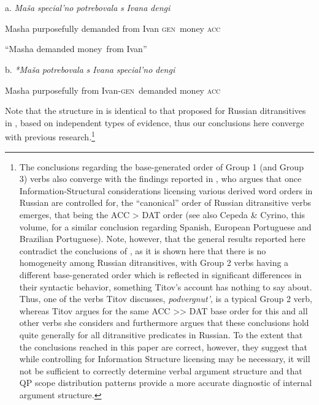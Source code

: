 \documentclass[output=paper,modfonts, nonflat]{langsci/langscibook}
\begin{document}
\begin{styleinnerExample}
\ea%
    \label{ex:key:48}
    \gll\\
        \\
    \glt
    \z

           a.  \textit{Maša}   \textit{special’no}    \textit{potrebovala} \textit{s}       \textit{Ivana}      \textit{dengi~}
\end{styleinnerExample}

\begin{styleinnerExample}
    Masha purposefully demanded     from Ivan \textsc{gen~}money \textsc{acc}
\end{styleinnerExample}

\begin{styleinnerExample}
    “Masha demanded money~from Ivan”\\\end{styleinnerExample}

\begin{styleinnerExample}
  b.  \textit{*Maša}   \textit{potrebovala}  \textit{s}       \textit{Ivana}       \textit{special’no} \textit{dengi}~
\end{styleinnerExample}

\begin{styleinnerExample}
      Masha purposefully from Ivan\textsc{{}-gen~}demanded  money \textsc{acc}
\end{styleinnerExample}

Note that the structure in  is identical to that proposed for Russian ditransitives in \citet{Bailyn1995},  based on independent types of evidence, thus our conclusions here converge with previous research.\footnote{The conclusions regarding the base-generated order of Group 1 (and Group 3) verbs also converge with the findings reported in \citet{Titov2017}, who argues that once Information-Structural considerations licensing various derived word orders in Russian are controlled for, the “canonical” order of Russian ditransitive verbs emerges, that being the ACC > DAT order (see also Cepeda \& Cyrino, this volume, for a similar conclusion regarding Spanish, European Portuguese and Brazilian Portuguese). Note, however, that the general results reported here contradict the conclusions of \citet{Titov2017}, as it is shown here that there is no homogeneity among Russian ditransitives, with Group 2 verbs having a different base-generated order which is reflected in significant differences in their syntactic behavior, something Titov’s account has nothing to say about. Thus, one of the verbs Titov discusses, \textit{podvergnut’}, is a typical Group 2 verb, whereas Titov argues for the same ACC >> DAT base order for this and all other verbs she considers and furthermore argues that these conclusions hold quite generally for all ditransitive predicates in Russian. To the extent that the conclusions reached in this paper are correct, however, they suggest that while controlling for Information Structure licensing may be necessary, it will not be sufficient to correctly determine verbal argument structure and that QP scope distribution patterns provide a more accurate diagnostic of internal argument structure.} 
\end{document}
